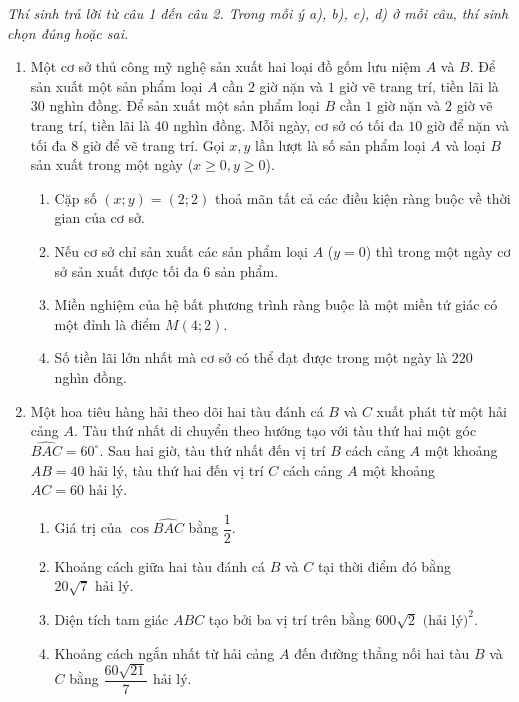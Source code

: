 \documentclass[12pt,a4paper]{article}
\newcommand{\parttitle}[1]{\par\vspace{1.5pt}\needspace{2\baselineskip}{\large\bfseries\color{ink}#1}\par\nopagebreak\vspace{1pt}}
\begin{document}
\parttitle{PHẦN II. Trắc nghiệm đúng/sai}
\textit{Thí sinh trả lời từ câu 1 đến câu 2. Trong mỗi ý a), b), c), d) ở mỗi câu, thí sinh chọn đúng hoặc sai.}
\begin{enumerate}
\item Một cơ sở thủ công mỹ nghệ sản xuất hai loại đồ gốm lưu niệm $A$ và $B$. Để sản xuất một sản phẩm loại $A$ cần $2$ giờ nặn và $1$ giờ vẽ trang trí, tiền lãi là $30$ nghìn đồng. Để sản xuất một sản phẩm loại $B$ cần $1$ giờ nặn và $2$ giờ vẽ trang trí, tiền lãi là $40$ nghìn đồng. Mỗi ngày, cơ sở có tối đa $10$ giờ để nặn và tối đa $8$ giờ để vẽ trang trí. Gọi $x, y$ lần lượt là số sản phẩm loại $A$ và loại $B$ sản xuất trong một ngày ($x \ge 0, y \ge 0$).
\begin{enumerate}
    \item Cặp số $(x; y) = (2; 2)$ thoả mãn tất cả các điều kiện ràng buộc về thời gian của cơ sở.
    \item Nếu cơ sở chỉ sản xuất các sản phẩm loại $A$ ($y = 0$) thì trong một ngày cơ sở sản xuất được tối đa $6$ sản phẩm.
    \item Miền nghiệm của hệ bất phương trình ràng buộc là một miền tứ giác có một đỉnh là điểm $M(4; 2)$.
    \item Số tiền lãi lớn nhất mà cơ sở có thể đạt được trong một ngày là $220$ nghìn đồng.
\end{enumerate}

\item Một hoa tiêu hàng hải theo dõi hai tàu đánh cá $B$ và $C$ xuất phát từ một hải cảng $A$. Tàu thứ nhất di chuyển theo hướng tạo với tàu thứ hai một góc $\widehat{BAC} = 60^\circ$. Sau hai giờ, tàu thứ nhất đến vị trí $B$ cách cảng $A$ một khoảng $AB = 40\text{ hải lý}$, tàu thứ hai đến vị trí $C$ cách cảng $A$ một khoảng $AC = 60\text{ hải lý}$.
\begin{enumerate}
    \item Giá trị của $\cos \widehat{BAC}$ bằng $\dfrac{1}{2}$.
    \item Khoảng cách giữa hai tàu đánh cá $B$ và $C$ tại thời điểm đó bằng $20\sqrt{7}\text{ hải lý}$.
    \item Diện tích tam giác $ABC$ tạo bởi ba vị trí trên bằng $600\sqrt{2}\text{ (hải lý)}^2$.
    \item Khoảng cách ngắn nhất từ hải cảng $A$ đến đường thẳng nối hai tàu $B$ và $C$ bằng $\dfrac{60\sqrt{21}}{7}\text{ hải lý}$.
\end{enumerate}
\end{enumerate}
\end{document}
